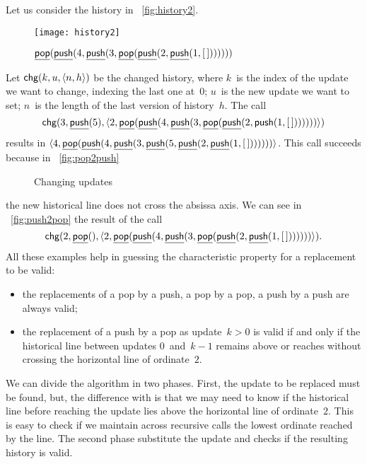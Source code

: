 Let us consider the history in \fig~\vref{fig:history2}.
\begin{figure}
\centering
\texttt{[image: history2]}%
\caption{$\underline{\textsf{pop}}(\underline{\textsf{push}}(4,\underline{\textsf{push}}(3,
          \underline{\textsf{pop}}(\underline{\textsf{push}}(2,\underline{\textsf{push}}(1,[\,]))))))$
\label{fig:history2}}
\end{figure}
Let \(\textsf{chg}(k,u,\langle{n},{h}\rangle)\) be the
changed history, where \(k\)~is the index of the update we want to
change, indexing the last one at~\(0\); \(u\)~is the new update we
want to set; \(n\)~is the length of the last version of
history~\(h\). The call
\begin{equation*}
\textsf{chg}(3,\underline{\textsf{push}}(5),
  \langle{2},{\underline{\textsf{pop}}(\underline{\textsf{push}}(4,\underline{\textsf{push}}(3,
           \underline{\textsf{pop}}(\underline{\textsf{push}}(2,\textsf{push}(1,[\,]))))))}\rangle)
\end{equation*}
results in
\(\langle{4},{\underline{\textsf{pop}}(\underline{\textsf{push}}(4,\underline{\textsf{push}}(3,\underline{\textsf{push}}(5,
  \underline{\textsf{push}}(2,\underline{\textsf{push}}(1,[\,]))))))}\rangle\). \!\!This call succeeds
because in \fig~\ref{fig:pop2push}
\begin{figure}
\centering
{}
\quad
{}
\caption{Changing updates}
\end{figure}
the new historical line does not cross the absissa axis. We can see in
\fig~\ref{fig:push2pop} the result of the call
\begin{equation*}
\textsf{chg}(2,\underline{\textsf{pop}}(),
            \langle{2},{\underline{\textsf{pop}}(\underline{\textsf{push}}(4,\underline{\textsf{push}}(3,
                     \underline{\textsf{pop}}(\underline{\textsf{push}}(2,\underline{\textsf{push}}(1,[\,]))))))}\rangle).
\end{equation*}
All these examples help in guessing the characteristic property for a
replacement to be valid:
\begin{itemize}

  \item the replacements of a pop by a push, a pop by a pop, a push by
    a push are always valid;

  \item the replacement of a push by a pop as update~\(k>0\) is valid
    if and only if the historical line between updates
    \(0\)~and~\(k-1\) remains above or reaches without crossing the
    horizontal line of ordinate~\(2\).

\end{itemize}
We can divide the algorithm in two phases. First, the update to be
replaced must be found, but, the difference with  is
that we may need to know if the historical line before reaching the
update lies above the horizontal line of ordinate~\(2\). This is easy
to check if we maintain across recursive calls the lowest ordinate
reached by the line. The second phase substitute the update and checks
if the resulting history is valid.

